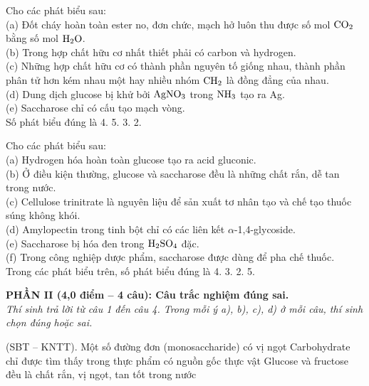 \documentclass[12pt,a4paper]{article}
\begin{document}
\begin{ex}
Cho các phát biểu sau:\\
(a) Đốt cháy hoàn toàn ester no, đơn chức, mạch hở luôn thu được số mol $\ce{CO2}$ bằng số mol $\ce{H2O}$.\\
(b) Trong hợp chất hữu cơ nhất thiết phải có carbon và hydrogen.\\
(c) Những hợp chất hữu cơ có thành phần nguyên tố giống nhau, thành phần phân tử hơn kém nhau một hay nhiều nhóm $\ce{CH2}$ là đồng đẳng của nhau.\\
(d) Dung dịch glucose bị khử bởi $\ce{AgNO3}$ trong $\ce{NH3}$ tạo ra Ag.\\
(e) Saccharose chỉ có cấu tạo mạch vòng.\\
Số phát biểu đúng là
\choice
{4.}
{5.}
{3.}
{2.}
\loigiai{}
\end{ex}

\begin{ex}
Cho các phát biểu sau:\\
(a) Hydrogen hóa hoàn toàn glucose tạo ra acid gluconic.\\
(b) Ở điều kiện thường, glucose và saccharose đều là những chất rắn, dễ tan trong nước.\\
(c) Cellulose trinitrate là nguyên liệu để sản xuất tơ nhân tạo và chế tạo thuốc súng không khói.\\
(d) Amylopectin trong tinh bột chỉ có các liên kết $\alpha$-1,4-glycoside.\\
(e) Saccharose bị hóa đen trong $\ce{H2SO4}$ đặc.\\
(f) Trong công nghiệp dược phẩm, saccharose được dùng để pha chế thuốc.\\
Trong các phát biểu trên, số phát biểu đúng là
\choice
{4.}
{3.}
{2.}
{5.}
\loigiai{}
\end{ex}


\vspace{0.15cm}
\noindent
\textbf{PHẦN II (4,0 điểm -- 4 câu): Câu trắc nghiệm đúng sai.}\\
\textit{Thí sinh trả lời từ câu 1 đến câu 4. Trong mỗi ý a), b), c), d) ở mỗi câu, thí sinh chọn đúng hoặc sai.}

\setcounter{ex}{0}

\begin{ex}
(SBT -- KNTT).
{Một số đường đơn (monosaccharide) có vị ngọt}
{Carbohydrate chỉ được tìm thấy trong thực phẩm có nguồn gốc thực vật}
{Glucose và fructose đều là chất rắn, vị ngọt, tan tốt trong nước}
\loigiai{}
\end{ex}
\end{document}
